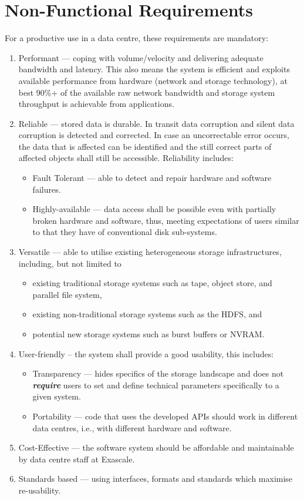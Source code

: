 \section{Non-Functional Requirements}
\label{sec: requirements/non functional}


For a productive use in a data centre, these requirements are mandatory:
\begin{enumerate}
\item Performant --- coping with volume/velocity and delivering adequate bandwidth and latency. This also means the system is efficient and exploits available performance from hardware (network and storage technology), at best 90\%+ of the available raw network bandwidth and storage system throughput is achievable from applications.
\item Reliable --- stored data is durable. In transit data corruption and silent data corruption is detected and corrected. In case an uncorrectable error occurs, the data that is affected can be identified and the still correct parts of affected objects shall still be accessible. Reliability includes:
  \begin{itemize}
  \item Fault Tolerant --- able to detect and repair hardware and software failures.
  \item Highly-available --- data access shall be possible even with partially broken hardware and software, thus, meeting expectations of users similar to that they have of conventional disk sub-systems.
  \end{itemize}
\item Versatile ---  able to utilise existing heterogeneous storage infrastructures, including, but not limited to
  \begin{itemize}
  \item existing traditional storage systems such as tape, object store, and parallel file system,
  \item existing non-traditional storage systems such as the HDFS, and
  \item potential new storage systems such as burst buffers or NVRAM.
  \end{itemize}
\item User-friendly -- the system shall provide a good usability, this includes:
  \begin{itemize}
  \item Transparency --- hides specifics of the storage landscape and does not \textit{\textbf{require}} users to set and define technical parameters specifically to a given system.
  \item Portability --- code that uses the developed APIs should work in different data centres, i.e., with different hardware and software.
  \end{itemize}
\item Cost-Effective --- the software system should be affordable and maintainable by data centre staff at Exascale.

\item Standards based --- using interfaces, formats and standards which maximise re-usability.
\end{enumerate}
